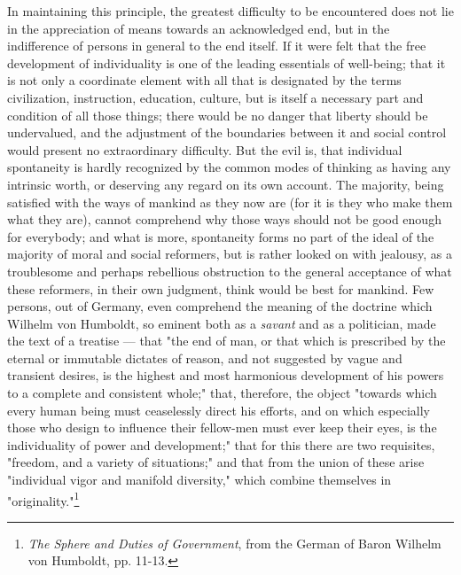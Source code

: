 \documentclass[12pt]{report}
\begin{document}
In maintaining this principle, the greatest difficulty to be encountered does not lie in the appreciation of means towards an acknowledged end, but in the indifference of persons in general to the end itself. If it were felt that the free development of individuality is one of the leading essentials of well-being; that it is not only a coordinate element with all that is designated by the terms civilization, instruction, education, culture, but is itself a necessary part and condition of all those things; there would be no danger that liberty should be undervalued, and the adjustment of the boundaries between it and social control would present no extraordinary difficulty. But the evil is, that individual spontaneity is hardly recognized by the common modes of thinking as having any intrinsic worth, or deserving any regard on its own account. The majority, being satisfied with the ways of mankind as they now are (for it is they who make them what they are), cannot comprehend why those ways should not be good enough for everybody; and what is more, spontaneity forms no part of the ideal of the majority of moral and social reformers, but is rather looked on with jealousy, as a troublesome and perhaps rebellious obstruction to the general acceptance of what these reformers, in their own judgment, think would be best for mankind. Few persons, out of Germany, even comprehend the meaning of the doctrine which Wilhelm von Humboldt, so eminent both as a \emph{savant} and as a politician, made the text of a treatise — that "the end of man, or that which is prescribed by the eternal or immutable dictates of reason, and not suggested by vague and transient desires, is the highest and most harmonious development of his powers to a complete and consistent whole;" that, therefore, the object "towards which every human being must ceaselessly direct his efforts, and on which especially those who design to influence their fellow-men must ever keep their eyes, is the individuality of power and development;" that for this there are two requisites, "freedom, and a variety of situations;" and that from the union of these arise "individual vigor and manifold diversity," which combine themselves in "originality."\footnote{\emph{The Sphere and Duties of Government}, from the German of Baron Wilhelm von Humboldt, pp. 11-13.}
\end{document}
